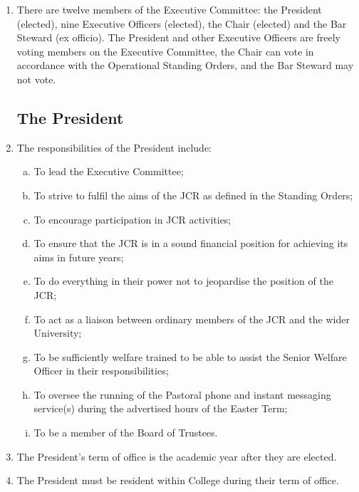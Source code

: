 \documentclass[12pt]{article}
\begin{document}
\begin{enumerate}
    \item There are twelve members of the Executive Committee: the President (elected), nine Executive Officers (elected), the Chair (elected) and the Bar Steward (ex officio).
    The President and other Executive Officers are freely voting members on the Executive Committee, the Chair can vote in accordance with the Operational Standing Orders, and the Bar Steward may not vote.
    \subsection{The President}
    \item The responsibilities of the President include:
    \begin{enumerate}[(a)]
        \item To lead the Executive Committee;
        \item To strive to fulfil the aims of the JCR as defined in the Standing Orders;
        \item To encourage participation in JCR activities;
        \item To ensure that the JCR is in a sound financial position for achieving its aims in future years;
        \item To do everything in their power not to jeopardise the position of the JCR;
        \item To act as a liaison between ordinary members of the JCR and the wider University;
        \item To be sufficiently welfare trained to be able to assist the Senior Welfare Officer in their responsibilities;
        \item To oversee the running of the Pastoral phone and instant messaging service(s) during the advertised hours of the Easter Term;
        \item To be a member of the Board of Trustees.
    \end{enumerate}
    \item The President's term of office is the academic year after they are elected.
    \item The President must be resident within College during their term of office.

\end{enumerate}
\end{document}
